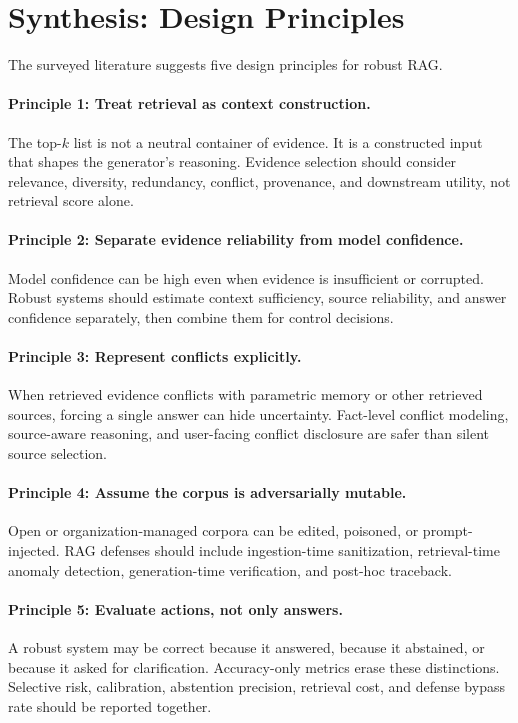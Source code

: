 \documentclass[11pt]{article}
\begin{document}
\section{Synthesis: Design Principles}
\label{sec:synthesis}

The surveyed literature suggests five design principles for robust RAG.

\paragraph{Principle 1: Treat retrieval as context construction.}
The top-$k$ list is not a neutral container of evidence. It is a constructed input that shapes the generator's reasoning. Evidence selection should consider relevance, diversity, redundancy, conflict, provenance, and downstream utility, not retrieval score alone.

\paragraph{Principle 2: Separate evidence reliability from model confidence.}
Model confidence can be high even when evidence is insufficient or corrupted. Robust systems should estimate context sufficiency, source reliability, and answer confidence separately, then combine them for control decisions.

\paragraph{Principle 3: Represent conflicts explicitly.}
When retrieved evidence conflicts with parametric memory or other retrieved sources, forcing a single answer can hide uncertainty. Fact-level conflict modeling, source-aware reasoning, and user-facing conflict disclosure are safer than silent source selection.

\paragraph{Principle 4: Assume the corpus is adversarially mutable.}
Open or organization-managed corpora can be edited, poisoned, or prompt-injected. RAG defenses should include ingestion-time sanitization, retrieval-time anomaly detection, generation-time verification, and post-hoc traceback.

\paragraph{Principle 5: Evaluate actions, not only answers.}
A robust system may be correct because it answered, because it abstained, or because it asked for clarification. Accuracy-only metrics erase these distinctions. Selective risk, calibration, abstention precision, retrieval cost, and defense bypass rate should be reported together.
\end{document}
